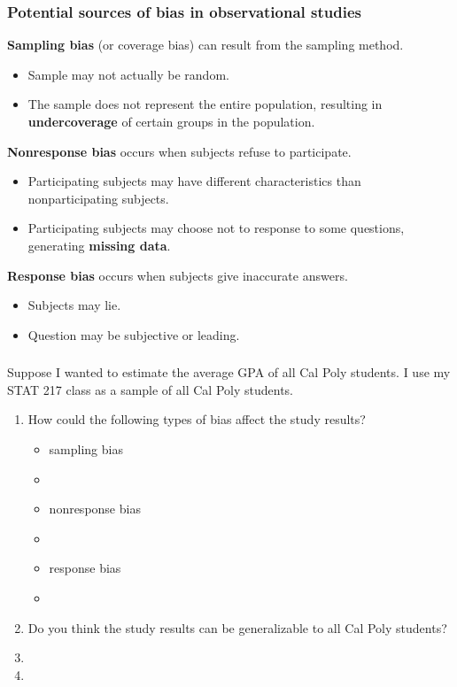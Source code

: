 \begin{frame}
\frametitle{Potential sources of bias in observational studies}
\textbf{Sampling bias} (or coverage bias) can result from the sampling method.
\begin{itemize}
    \item
    Sample may not actually be random.
    \item
    The sample does not represent the entire population, resulting in \textbf{undercoverage} of certain groups in the population.
\end{itemize}
\vskip5pt
\textbf{Nonresponse bias} occurs when subjects refuse to participate.
\begin{itemize}
    \item
    Participating subjects may have different characteristics than nonparticipating subjects.
    \item
    Participating subjects may choose not to response to some questions, generating \textbf{missing data}.
\end{itemize}
\vskip5pt
\textbf{Response bias} occurs when subjects give inaccurate answers.
\begin{itemize}
    \item
    Subjects may lie.
    \item
    Question may be subjective or leading.
\end{itemize}
\end{frame}

\begin{frame}
\frametitle{\grp}
\begin{clicker}{Suppose I wanted to estimate the average GPA of all Cal Poly students.  I use my STAT 217 class as a sample of all Cal Poly students.}
\begin{enumerate}
\item How could the following types of bias affect the study results?
\begin{itemize}
\item sampling bias
\item[]
\item nonresponse bias
\item[]
\item response bias 
\item[]
\end{itemize}
\item Do you think the study results can be generalizable to all Cal Poly students?
\item[]
\item[]
\end{enumerate}
\end{clicker}
\end{frame}

